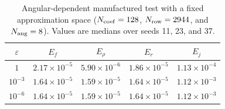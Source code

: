 \begin{table}[t]
\centering
\caption{Angular-dependent manufactured test with a fixed approximation space ($N_{\rm coef}=128$, $N_{\rm row}=2944$, and $N_{\rm ang}=8$). Values are medians over seeds 11, 23, and 37.}
\label{tab:angular-manufactured}
\begin{tabular}{ccccc}
\toprule
$\varepsilon$ & $E_f$ & $E_\rho$ & $E_r$ & $E_j$\\
\midrule
$1$ & $2.17\times10^{-5}$ & $5.90\times10^{-6}$ & $1.86\times10^{-5}$ & $1.13\times10^{-4}$\\
$10^{-3}$ & $1.64\times10^{-5}$ & $1.59\times10^{-5}$ & $1.64\times10^{-5}$ & $1.12\times10^{-3}$\\
$10^{-6}$ & $1.64\times10^{-5}$ & $1.59\times10^{-5}$ & $1.64\times10^{-5}$ & $1.12\times10^{-3}$\\
\bottomrule
\end{tabular}
\end{table}
